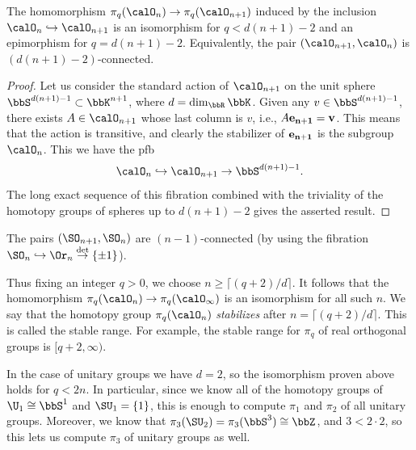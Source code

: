 \begin{prop}\label{prop 10.9.6 Shastri}
    The homomorphism $\pi_q(\calO_n)\to \pi_q(\calO_{n+1})$ induced by the inclusion $\calO_n\hookrightarrow \calO_{n+1}$  is an isomorphism for $q<d(n+1)-2$ and an epimorphism for $q=d(n+1)-2$. Equivalently, the pair $(\calO_{n+1},\calO_n)$ is $(d(n+1)-2)$-connected.
\end{prop}
\begin{proof}
    Let us consider the standard action of $\calO_{n+1}$ on the unit sphere $\bbS^{d(n+1)-1}\subset \bbK^{n+1}$, where $d=\dim_\bbR\bbK$. Given any $v\in \bbS^{d(n+1)-1}$, there exists $A\in\calO_{n+1}$ whose last column is $v$, i.e., $ A\bf{e}_{n+1}=v$. This means that the action is transitive, and clearly the stabilizer of $\bf{e}_{n+1}$ is the subgroup $\calO_n$. This we have the \gls{pfb}
    \[\calO_n\hookrightarrow \calO_{n+1}\to \bbS^{d(n+1)-1}.\]
    The long exact sequence of this fibration combined with the triviality of the homotopy groups of spheres up to $d(n+1)-2$ gives the asserted result.
\end{proof}
\begin{cor}
    The pairs $(\SO_{n+1},\SO_n)$ are $(n-1)$-connected (by using the fibration $\SO_n\hookrightarrow \Or_n\overset{\det}{\to}\{\pm 1\}$).
\end{cor}
\begin{rem}
    Thus fixing an integer $q>0$, we choose $n\geq \lceil (q+2)/d\rceil$. It follows that the homomorphism $\pi_q(\calO_n)\to \pi_q(\calO_\infty)$ is an isomorphism for all such $n$. We say that the homotopy group $\pi_q(\calO_n)$ \emph{stabilizes} after $n=\lceil (q+2)/d\rceil$. This is called the stable range. For example, the stable range for $\pi_q$ of real orthogonal groups is $[q+2,\infty)$.
\end{rem}

In the case of unitary groups we have $d=2$, so the isomorphism proven above holds for $q<2n$. In particular, since we know all of the homotopy groups of $\U_1\cong \bbS^1$ and $\SU_1=\{1\}$, this is enough to compute $\pi_1$ and $\pi_2$ of all unitary groups. Moreover, we know that $\pi_3(\SU_2)=\pi_3(\bbS^3)\cong\bbZ$, and $3<2\cdot 2$, so this lets us compute $\pi_3$ of unitary groups as well. 

